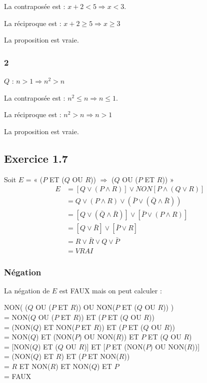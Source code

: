 \documentclass[a4paper,10pt]{report}
\begin{document}
La contraposée est : $x+2 <5 \Longrightarrow x<3$.

La réciproque est : $x+2 \geq 5 \Longrightarrow x \geq 3$

La proposition est vraie.

\subsubsection*{2}
$Q$ : $n>1 \Longrightarrow n^2 > n $

La contraposée est : $n^2 \leq n \Longrightarrow n \leq 1$.

La réciproque est : $n^2 > n \Longrightarrow n>1$

La proposition est vraie.


\subsection*{Exercice 1.7}

Soit $E$ = « ($P$ ET ($Q$ OU $R$)) $\Longrightarrow$ ($Q$ OU ($P$ ET $R$)) »
\begin{equation*}
	\begin{split}
		E &= [Q \vee (P \wedge R)]\vee NON[P \wedge (Q \vee R)] \\
		  &= Q \vee (P \wedge R) \vee (\bar{P} \vee (\bar{Q} \wedge \bar{R})) \\
		  &= [Q \vee (\bar{Q} \wedge \bar{R})] \vee [\bar{P} \vee (P \wedge R)] \\
		  &= [Q \vee \bar{R}] \vee [\bar{P} \vee R] \\
		  &= R \vee \bar{R} \vee Q \vee \bar{P} \\
		  &= VRAI
	\end{split}
\end{equation*}

\subsubsection*{Négation}
La négation de $E$ est FAUX mais on peut calculer : 

NON( ($Q$ OU ($P$ ET $R$)) OU NON($P$ ET ($Q$ OU $R$)) ) \\
= NON($Q$ OU ($P$ ET $R$)) ET ($P$ ET ($Q$ OU $R$)) \\
= (NON($Q$) ET NON($P$ ET $R$)) ET ($P$ ET ($Q$ OU $R$)) \\
= NON($Q$) ET (NON($P$) OU NON($R$)) ET $P$ ET ($Q$ OU $R$) \\
= [NON($Q$) ET ($Q$ OU $R$)] ET [$P$ ET (NON($P$) OU NON($R$))]  \\
= (NON($Q$) ET $R$) ET ($P$ ET NON($R$)) \\
= $R$ ET NON($R$) ET NON($Q$) ET $P$ \\
= FAUX
\end{document}

